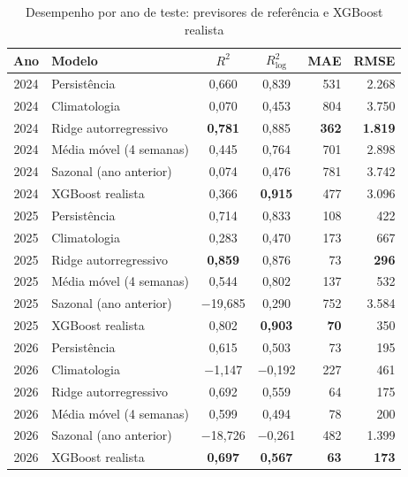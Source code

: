 \begin{table}[htb]
\centering
\caption{Desempenho por ano de teste: previsores de referência e XGBoost realista}
\label{tab:por_ano}
\small
\begin{tabular}{|c|l|c|c|r|r|}
\hline
\textbf{Ano} & \textbf{Modelo} & \textbf{$R^2$} & \textbf{$R^2_{\log}$} & \textbf{MAE} & \textbf{RMSE} \\ \hline
2024 & Persistência & 0,660 & 0,839 & 531 & 2.268 \\ \hline
2024 & Climatologia & 0,070 & 0,453 & 804 & 3.750 \\ \hline
2024 & Ridge autorregressivo & \textbf{0,781} & 0,885 & \textbf{362} & \textbf{1.819} \\ \hline
2024 & Média móvel (4 semanas) & 0,445 & 0,764 & 701 & 2.898 \\ \hline
2024 & Sazonal (ano anterior) & 0,074 & 0,476 & 781 & 3.742 \\ \hline
2024 & XGBoost realista & 0,366 & \textbf{0,915} & 477 & 3.096 \\ \hline
\hline
2025 & Persistência & 0,714 & 0,833 & 108 & 422 \\ \hline
2025 & Climatologia & 0,283 & 0,470 & 173 & 667 \\ \hline
2025 & Ridge autorregressivo & \textbf{0,859} & 0,876 & 73 & \textbf{296} \\ \hline
2025 & Média móvel (4 semanas) & 0,544 & 0,802 & 137 & 532 \\ \hline
2025 & Sazonal (ano anterior) & $-$19,685 & 0,290 & 752 & 3.584 \\ \hline
2025 & XGBoost realista & 0,802 & \textbf{0,903} & \textbf{70} & 350 \\ \hline
\hline
2026 & Persistência & 0,615 & 0,503 & 73 & 195 \\ \hline
2026 & Climatologia & $-$1,147 & $-$0,192 & 227 & 461 \\ \hline
2026 & Ridge autorregressivo & 0,692 & 0,559 & 64 & 175 \\ \hline
2026 & Média móvel (4 semanas) & 0,599 & 0,494 & 78 & 200 \\ \hline
2026 & Sazonal (ano anterior) & $-$18,726 & $-$0,261 & 482 & 1.399 \\ \hline
2026 & XGBoost realista & \textbf{0,697} & \textbf{0,567} & \textbf{63} & \textbf{173} \\ \hline
\end{tabular}
\end{table}

